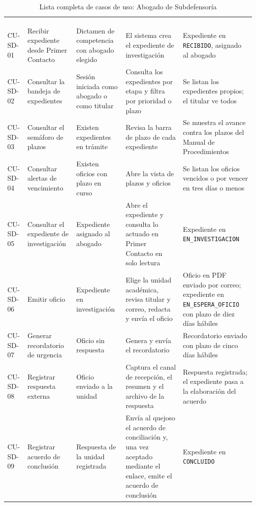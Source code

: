 \footnotesize
\renewcommand{\arraystretch}{1.2}
\setlength{\tabcolsep}{4pt}
\begin{longtable}{|L{1.6cm}|L{3.0cm}|L{2.9cm}|L{4.2cm}|L{3.5cm}|}
	\hiderowcolors\caption{Lista completa de casos de uso: Abogado de Subdefensoría}
	\label{tab:anx_cu_sd} \\ \showrowcolors
	\hline
	 &  &  &  &  \\
	\hline
	\endfirsthead
	\hline
	 &  &  &  &  \\
	\hline
	\endhead
	CU-SD-01 & Recibir expediente desde Primer Contacto & Dictamen de competencia con abogado elegido & El sistema crea el expediente de investigación & Expediente en \texttt{RECIBIDO}, asignado al abogado \\ \hline
	CU-SD-02 & Consultar la bandeja de expedientes & Sesión iniciada como abogado o como titular & Consulta los expedientes por etapa y filtra por prioridad o plazo & Se listan los expedientes propios; el titular ve todos \\ \hline
	CU-SD-03 & Consultar el semáforo de plazos & Existen expedientes en trámite & Revisa la barra de plazo de cada expediente & Se muestra el avance contra los plazos del Manual de Procedimientos \\ \hline
	CU-SD-04 & Consultar alertas de vencimiento & Existen oficios con plazo en curso & Abre la vista de plazos y oficios & Se listan los oficios vencidos o por vencer en tres días o menos \\ \hline
	CU-SD-05 & Consultar el expediente de investigación & Expediente asignado al abogado & Abre el expediente y consulta lo actuado en Primer Contacto en solo lectura & Expediente en \texttt{EN\_INVESTIGACION} \\ \hline
	CU-SD-06 & Emitir oficio & Expediente en investigación & Elige la unidad académica, revisa titular y correo, redacta y envía el oficio & Oficio en PDF enviado por correo; expediente en \texttt{EN\_ESPERA\_OFICIO} con plazo de diez días hábiles \\ \hline
	CU-SD-07 & Generar recordatorio de urgencia & Oficio sin respuesta & Genera y envía el recordatorio & Recordatorio enviado con plazo de cinco días hábiles \\ \hline
	CU-SD-08 & Registrar respuesta externa & Oficio enviado a la unidad & Captura el canal de recepción, el resumen y el archivo de la respuesta & Respuesta registrada; el expediente pasa a la elaboración del acuerdo \\ \hline
	CU-SD-09 & Registrar acuerdo de conclusión & Respuesta de la unidad registrada & Envía al quejoso el acuerdo de conciliación y, una vez aceptado mediante el enlace, emite el acuerdo de conclusión & Expediente en \texttt{CONCLUIDO} \\ \hline
\end{longtable}
\normalsize
\setlength{\tabcolsep}{6pt}
\renewcommand{\arraystretch}{1}

